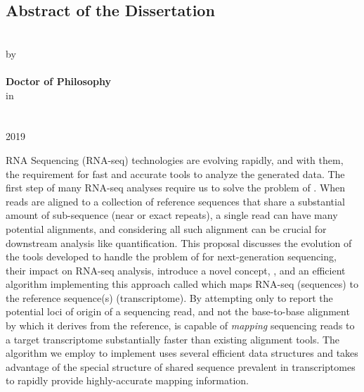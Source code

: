 \documentclass[
12pt, %
oneside, %
english, %
singlespacing, %
liststotoc, %
parskip, %
headsepline, %
]{main} %
\begin{document}


\renewcommand{\abstractname}{Abstract of the Dissertation}
\begin{center}
	\section*{\abstractname}
	\addchaptertocentry{\abstractname} %

		\textbf{\ttitle} \\ [0.5cm]
		by  \\ [0.5cm]
		\textbf{\authorname} \\ [0.5cm]
		\textbf{Doctor of Philosophy} \\ [0.5cm]
		in \\ [0.5cm]
		\textbf{\deptname}  \\ [0.5cm]
		\univname  \\ [0.5cm]
		2019  \\ [0.5cm]
\end{center}

RNA Sequencing (RNA-seq) technologies are evolving rapidly, and with them, the requirement 
for fast and accurate tools to analyze the generated data. The first step of many RNA-seq
analyses require us to solve the problem of \ra. When reads are aligned to a collection of 
reference sequences that share a substantial amount of sub-sequence (near or exact repeats), 
a single read can have many potential alignments, and considering all such alignment can be 
crucial for downstream analysis like quantification. This proposal discusses the evolution of 
the tools developed to handle the problem of \ra for next-generation sequencing, their impact 
on RNA-seq analysis, introduce a novel concept, \qm, and an efficient algorithm implementing 
this approach called \rapmap which maps RNA-seq \reads (sequences) to the reference sequence(s) 
(transcriptome). By attempting only to report the potential loci of origin of a sequencing read, 
and not the base-to-base alignment by which it derives from the reference, \rapmap is capable of 
\textit{mapping} sequencing reads to a target transcriptome substantially faster than existing 
alignment tools. The algorithm we employ to implement \qm uses several efficient data structures 
and takes advantage of the special structure of shared sequence prevalent in transcriptomes to 
rapidly provide highly-accurate mapping information.
\end{document}
